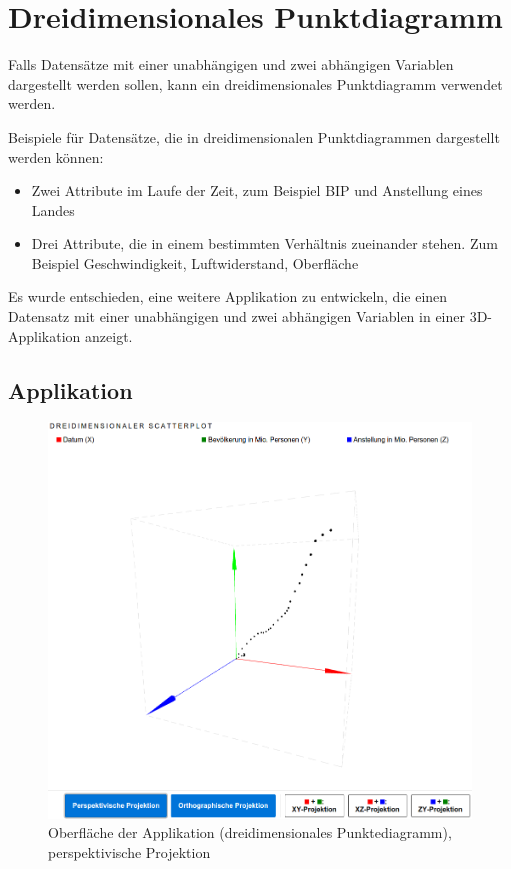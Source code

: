 \section{Dreidimensionales Punktdiagramm}

Falls Datensätze mit einer unabhängigen und zwei abhängigen Variablen dargestellt werden sollen, kann ein dreidimensionales Punktdiagramm verwendet werden.

Beispiele für Datensätze, die in dreidimensionalen Punktdiagrammen dargestellt werden können:

\begin{itemize}
	\item Zwei Attribute im Laufe der Zeit, zum Beispiel BIP und Anstellung eines Landes
	\item Drei Attribute, die in einem bestimmten Verhältnis zueinander stehen. Zum Beispiel Geschwindigkeit, Luftwiderstand, Oberfläche
\end{itemize}

Es wurde entschieden, eine weitere Applikation zu entwickeln, die einen Datensatz mit einer unabhängigen und zwei abhängigen Variablen in einer 3D-Applikation anzeigt.

\subsection{Applikation}

\begin{figure}[H]
	\centering
	\includegraphics[width=\linewidth]{images/3d}
	\caption{Oberfläche der Applikation (dreidimensionales Punktediagramm), perspektivische Projektion}
	\label{fig:3d}
\end{figure}

